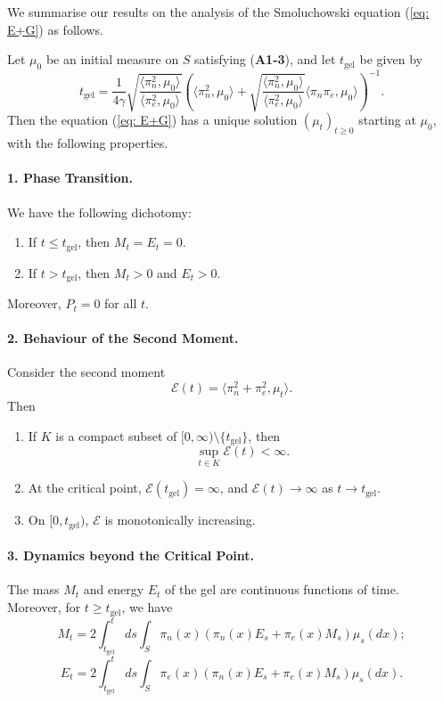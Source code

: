 We summarise our results on the analysis of the Smoluchowski equation (\ref{eq: E+G}) as follows.
\begin{theorem}
Let $\mu_0$ be an initial measure on $S$ satisfying (\textbf{A1-3}), and let $t_\text{gel}$ be given by 
    \begin{equation} \label{eq: def of tgel} t_\text{gel} = \frac{1}{4\gamma}\sqrt{\frac{\langle \pi_n^2, \mu_0\rangle}{\langle \pi_e^2, \mu_0\rangle}}\left(\langle \pi_n^2, \mu_0\rangle+\sqrt{\frac{\langle \pi_n^2, \mu_0\rangle}{\langle \pi_e^2, \mu_0\rangle}}\langle \pi_n\pi_e, \mu_0\rangle \right)^{-1}.
\end{equation} Then the equation (\ref{eq: E+G}) has a unique solution $(\mu_t)_{t\geq 0}$ starting at $\mu_0$, with the following properties.
\paragraph{1. Phase Transition.} We have the following dichotomy: \begin{enumerate}[label=\roman{*}).]
    \item If $t\leq t_\text{gel}$, then $M_t=E_t=0$.
    \item If $t>t_\text{gel}$, then $M_t>0$ and $E_t>0.$
\end{enumerate}
Moreover, $P_t=0$ for all $t.$
\paragraph{2. Behaviour of the Second Moment.} Consider the second moment \begin{equation} \mathcal{E}(t)=\langle \pi_n^2+ \pi_e^2, \mu_t\rangle. \end{equation} Then \begin{enumerate}[label=\roman{*}).]
    \item If $K$ is a compact subset of $[0, \infty)\setminus\{t_\text{gel}\}$, then \begin{equation}
        \sup_{t\in K}\mathcal{E}(t)<\infty.
    \end{equation}
    \item At the critical point, $\mathcal{E}(t_\text{gel})=\infty$, and $\mathcal{E}(t)\rightarrow \infty$ as $t\rightarrow t_\text{gel}.$ 
    \item On $[0, t_\text{gel})$, $\mathcal{E}$ is monotonically increasing. 
\end{enumerate}
\paragraph{3. Dynamics beyond the Critical Point.} The mass $M_t$ and energy $E_t$ of the gel are continuous functions of time. Moreover, for $t\geq t_\text{gel}$, we have \begin{equation}
    M_t=2\int_{t_\text{gel}}^t ds \int_S \pi_n(x)(\pi_n(x)E_s+\pi_e(x)M_s)\mu_s(dx);
\end{equation}\begin{equation}
    E_t=2\int_{t_\text{gel}}^t ds \int_S \pi_e(x)(\pi_n(x)E_s+\pi_e(x)M_s)\mu_s(dx).
\end{equation} 

\end{theorem}
